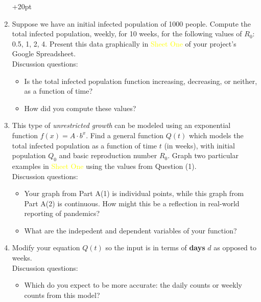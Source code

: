 \documentclass[11pt,reqno,final]{amsart}
\numberwithin{equation}{section}
\numberwithin{figure}{section}
\theoremstyle{definition} %
\begin{document}
\begin{enumerate}[(1)]\itemsep+20pt
\item Suppose we have an initial infected population of 1000 people.
        Compute the total infected population, weekly, for 10 weeks, for the following values of $R_0$: 0.5, 1, 2, 4.
        Present this data graphically in \textcolor{yellow}{Sheet One} of your project's Google Spreadsheet.\\

        Discussion questions:
        \begin{itemize}
        \item Is the total infected population function increasing, decreasing, or neither, as a function of time?
        \item How did you compute these values?
        \end{itemize}
        
        
\item This type of \textit{unrestricted growth} can be modeled using an exponential function $f(x) = A \cdot b^x$.
        Find a general function $Q(t)$ which models the total infected population as a function of time $t$ (in weeks),
        with initial population $Q_0$ and basic reproduction number $R_0$.
        Graph two particular examples in \textcolor{yellow}{Sheet One} using the values from Question (1).\\

        Discussion questions:
        \begin{itemize}
        \item Your graph from Part A(1) is individual points, while this graph from Part A(2) is continuous. How might this be a reflection in real-world reporting of pandemics?
        \item What are the indepedent and dependent variables of your function?
        \end{itemize}
        
\item Modify your equation $Q(t)$ so the input is in terms of \textbf{days} $d$ as opposed to weeks.\\

        Discussion questions:
        \begin{itemize}
        \item Which do you expect to be more accurate: the daily counts or weekly counts from this model?
        \end{itemize}
        
\end{enumerate}
\end{document}

